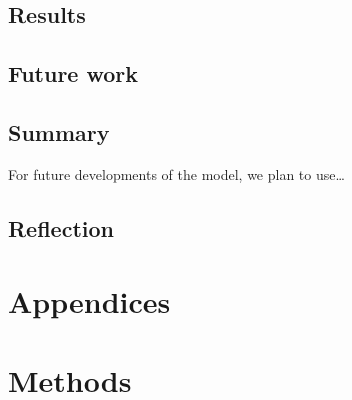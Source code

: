 \documentclass[12pt,a4paper]{article}
\begin{document}

    \subsection{Results}\label{subsec:improvements}
    
    \subsection{Future work}\label{subsec:future-work}

    \subsection{Summary}\label{subsec:summary4}

    For future developments of the model, we plan to use\ldots
    
    \subsection{Reflection}\label{subsec:reflection}



    \medskip

    
    

    \medskip

    \appendix
    \section*{Appendices}
    \section{Methods}\label{sec:methods}
\end{document}
